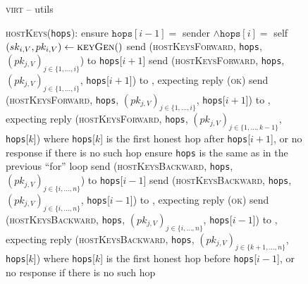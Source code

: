 \begin{figure}[H]
  \begin{processbox}{\textsc{virt} -- utils}
    \begin{algorithmic}[1]
      \State \textsc{hostKeys}(\texttt{hops}): 
      \Indent
         
            \State ensure $\texttt{hops}[i-1] =$ sender $\wedge \texttt{hops}[i]
            =$ self
          \EndIf
          \State $(sk_{i, V}, pk_{i, V}) \gets \textsc{keyGen}()$
            \State send (\textsc{hostKeysForward}, \texttt{hops}, $(pk_{j, V})_{j
            \in \{1, \dots, i\}}$) to \texttt{hops}[$i+1$]
          \Else \: 
              \State send (\textsc{hostKeysForward}, \texttt{hops}, $(pk_{j,
              V})_{j \in \{1, \dots, i\}}$, \texttt{hops}[$i+1$]) to \adversary,
              expecting reply (\textsc{ok})
            \Else \: 
              \State send (\textsc{hostKeysForward}, \texttt{hops}, $(pk_{j,
              V})_{j \in \{1, \dots, i\}}$, \texttt{hops}[$i+1$]) to \adversary,
              expecting reply (\textsc{hostKeysForward}, \texttt{hops}, $(pk_{j,
              V})_{j \in \{1, \dots, k-1\}}$, \texttt{hops}[$k$]) where
              \texttt{hops}[$k$] is the first honest hop after
              \texttt{hops}[$i+1$], or no response if there is no such hop
            \EndIf
          \EndIf
        \EndFor \: 
         
            \State ensure \texttt{hops} is the same as in the previous ``for''
            loop
          \EndIf
            \State send (\textsc{hostKeysBackward}, \texttt{hops}, $(pk_{j,
            V})_{j \in \{i, \dots, n\}}$) to \texttt{hops}[$i-1$]
          \Else \: 
              \State send (\textsc{hostKeysBackward}, \texttt{hops}, $(pk_{j,
              V})_{j \in \{i, \dots, n\}}$, \texttt{hops}[$i-1$]) to \adversary,
              expecting reply (\textsc{ok})
            \Else \: 
              \State send (\textsc{hostKeysBackward}, \texttt{hops}, $(pk_{j,
              V})_{j \in \{i, \dots, n\}}$, \texttt{hops}[$i-1$]) to \adversary,
              expecting reply (\textsc{hostKeysBackward}, \texttt{hops},
              $(pk_{j, V})_{j \in \{k+1, \dots, n\}}$, \texttt{hops}[$k$]) where
              \texttt{hops}[$k$] is the first honest hop before
              \texttt{hops}[$i-1$], or no response if there is no such hop
            \EndIf
          \EndIf
        \EndFor \: 
      \EndIndent
    \end{algorithmic}
  \end{processbox}
  \caption{}
  \label{code:virtual-layer:host-keys}
\end{figure}
